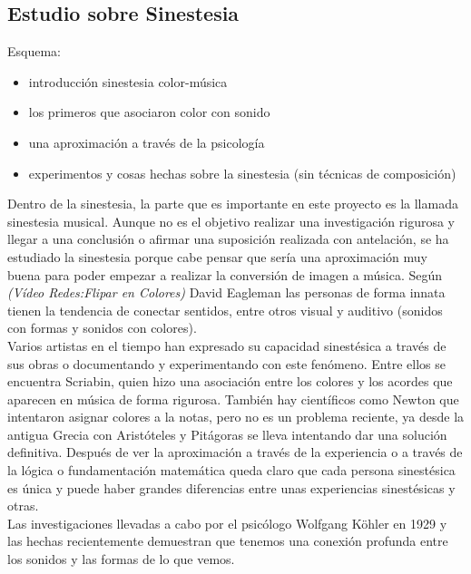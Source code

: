 \subsection{Estudio sobre Sinestesia}
\label{subsubsec:estudioSinestesia}

Esquema:
\begin{itemize}
\item introducción sinestesia color-música
\item los primeros que asociaron color con sonido
\item una aproximación a través de la psicología
\item experimentos y cosas hechas sobre la sinestesia (sin técnicas de composición)
\end{itemize}

Dentro de la sinestesia, la parte que es importante en este proyecto es la llamada sinestesia musical. Aunque no es el objetivo realizar una investigación rigurosa y llegar a una conclusión o afirmar una suposición realizada con antelación, se ha estudiado la sinestesia porque cabe pensar que sería una aproximación muy buena para poder empezar a realizar la conversión de imagen a música.
Según \emph{(Vídeo Redes:Flipar en Colores)} David Eagleman las personas de forma innata tienen la tendencia de conectar sentidos, entre otros visual y auditivo (sonidos con formas y sonidos con colores).\\

Varios artistas en el tiempo han expresado su capacidad sinestésica a través de sus obras o documentando y experimentando con este fenómeno. Entre ellos se encuentra Scriabin, quien hizo una asociación entre los colores y los acordes que aparecen en música de forma rigurosa. También hay científicos como Newton que intentaron asignar colores a la notas, pero no es un problema reciente, ya desde la antigua Grecia con Aristóteles y Pitágoras se lleva intentando dar una solución definitiva. Después de ver la aproximación a través de la experiencia o a través de la lógica o fundamentación matemática queda claro que cada persona sinestésica es única y puede haber grandes diferencias entre unas experiencias sinestésicas y otras.\\

Las investigaciones llevadas a cabo por el psicólogo Wolfgang Köhler en 1929 y las hechas recientemente demuestran que tenemos una conexión profunda entre los sonidos y las formas de lo que vemos. 


